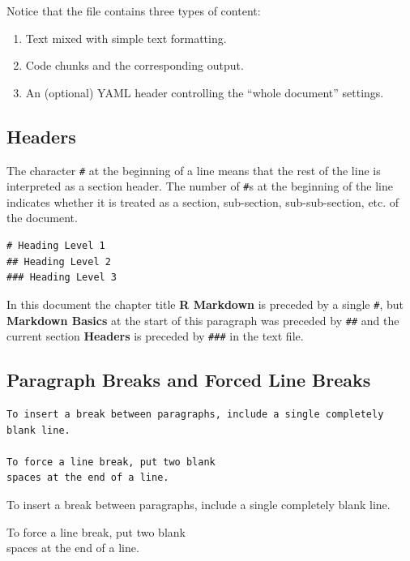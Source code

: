 \documentclass[]{book}
\providecommand{\tightlist}{%
  \setlength{\itemsep}{0pt}\setlength{\parskip}{0pt}}
\theoremstyle{definition}
\theoremstyle{definition}
\theoremstyle{definition}
\theoremstyle{remark}
\begin{document}
Notice that the file contains three types of content:

\begin{enumerate}
\def\labelenumi{\arabic{enumi}.}
\tightlist
\item
  Text mixed with simple text formatting.
\item
  Code chunks and the corresponding output.
\item
  An (optional) YAML header controlling the ``whole document'' settings.
\end{enumerate}

\hypertarget{headers}{%
\subsection{Headers}\label{headers}}

The character \texttt{\#} at the beginning of a line means that the rest
of the line is interpreted as a section header. The number of
\texttt{\#}s at the beginning of the line indicates whether it is
treated as a section, sub-section, sub-sub-section, etc. of the
document.

\begin{verbatim}
# Heading Level 1  
## Heading Level 2  
### Heading Level 3
\end{verbatim}

In this document the chapter title \textbf{R Markdown} is preceded by a
single \texttt{\#}, but \textbf{Markdown Basics} at the start of this
paragraph was preceded by \texttt{\#\#} and the current section
\textbf{Headers} is preceded by \texttt{\#\#\#} in the text file.

\hypertarget{paragraph-breaks-and-forced-line-breaks}{%
\subsection{Paragraph Breaks and Forced Line
Breaks}\label{paragraph-breaks-and-forced-line-breaks}}

\begin{verbatim}
To insert a break between paragraphs, include a single completely blank line.

To force a line break, put two blank  
spaces at the end of a line.
\end{verbatim}

To insert a break between paragraphs, include a single completely blank
line.

To force a line break, put two blank\\
spaces at the end of a line.
\end{document}
